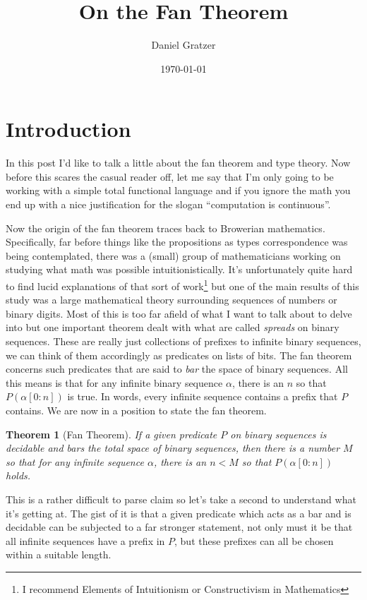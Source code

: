 \documentclass[12pt]{amsart}
\title{On the Fan Theorem}
\author{Daniel Gratzer}
\date{\today}
\newtheorem{thm}{Theorem}[section]
\begin{document}
\maketitle

\section{Introduction}

In this post I'd like to talk a little about the fan theorem and type
theory. Now before this scares the casual reader off, let me say that
I'm only going to be working with a simple total functional language
and if you ignore the math you end up with a nice justification for
the slogan ``computation is continuous''.

Now the origin of the fan theorem traces back to Browerian
mathematics. Specifically, far before things like the propositions as
types correspondence was being contemplated, there was a (small) group
of mathematicians working on studying what math was possible
intuitionistically. It's unfortunately quite hard to find lucid
explanations of that sort of work\footnote{I recommend Elements of
  Intuitionism or Constructivism in Mathematics} but one of the main
results of this study was a large mathematical theory surrounding
sequences of numbers or binary digits. Most of this is too far afield
of what I want to talk about to delve into but one important theorem
dealt with what are called \emph{spreads} on binary sequences. These
are really just collections of prefixes to infinite binary sequences,
we can think of them accordingly as predicates on lists of bits. The
fan theorem concerns such predicates that are said to \emph{bar} the
space of binary sequences. All this means is that for any infinite
binary sequence $\alpha$, there is an $n$ so that $P(\alpha[0:n])$ is
true. In words, every infinite sequence contains a prefix that $P$
contains. We are now in a position to state the fan theorem.
\begin{thm}[Fan Theorem]\label{thm:intro:fan1}
  If a given predicate $P$ on binary sequences is \emph{decidable} and
  \emph{bars} the total space of binary sequences, then there is a
  number $M$ so that for any infinite sequence $\alpha$, there is an
  $n < M$ so that $P(\alpha[0:n])$ holds.
\end{thm}
This is a rather difficult to parse claim so let's take a second to
understand what it's getting at. The gist of it is that a given
predicate which acts as a bar and is decidable can be subjected to a
far stronger statement, not only must it be that all infinite
sequences have a prefix in $P$, but these prefixes can all be chosen
within a suitable length.
\end{document}
